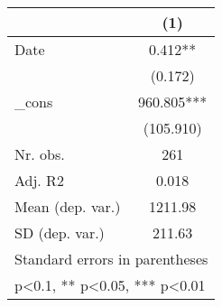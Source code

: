 {
\def\sym#1{\ifmmode^{#1}\else\(^{#1}\)\fi}
\begin{tabular}{l*{1}{c}}
\hline\hline
            &\multicolumn{1}{c}{(1)}   \\
\hline
Date        &       0.412** \\
            &     (0.172)   \\
[1em]
\_cons      &     960.805***\\
            &   (105.910)   \\
\hline
Nr. obs.    &         261   \\
Adj. R2     &       0.018   \\
Mean (dep. var.)&     1211.98   \\
SD (dep. var.)&      211.63   \\
\hline\hline
\multicolumn{2}{l}{\footnotesize Standard errors in parentheses}\\
\multicolumn{2}{l}{\footnotesize * p<0.1, ** p<0.05, *** p<0.01}\\
\end{tabular}
}
